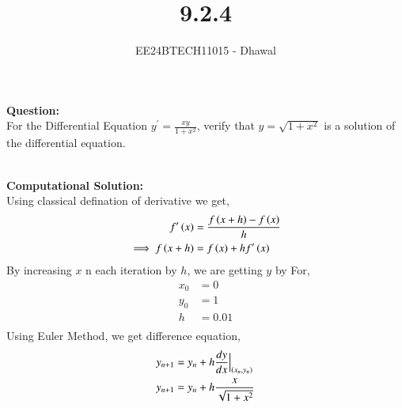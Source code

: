 \documentclass[journal]{IEEEtran}
\begin{document}

\vspace{3cm}

\title{9.2.4}
\author{EE24BTECH11015 - Dhawal}

{\let\newpage\relax\maketitle}

\renewcommand{\thefigure}{\theenumi}
\renewcommand{\thetable}{\theenumi}
\setlength{\intextsep}{10pt} %

\textbf{Question:}\\
For the Differential Equation $y^{\prime}=\frac{xy}{1+x^2}$, verify that $y=\sqrt{1+x^2}$ is a solution of the differential equation.

\\
\textbf{Computational Solution:}\\
Using classical defination of derivative we get,\\
\begin{align}
    f^{\prime}\left(x\right) &= \frac{f\left(x+h\right)-f\left(x\right)}{h}\\
    \implies f\left(x+h\right) &= f\left(x\right) + h f^{\prime}\left(x\right)
\end{align}
By increasing $x$ n each iteration by $h$, we are getting $y$ by 
For,
\begin{align}
x_0 &= 0\\
y_0 &= 1\\
h &= 0.01\\
\end{align}
Using Euler Method, we get difference equation,
\begin{align}
y_{n+1} &= y_n + h\frac{dy}{dx}\Big|_{\left(x_n,y_n\right)}\\
y_{n+1} &= y_n + h \frac{x}{\sqrt{1+x^2}}
\end{align}
\end{document}
